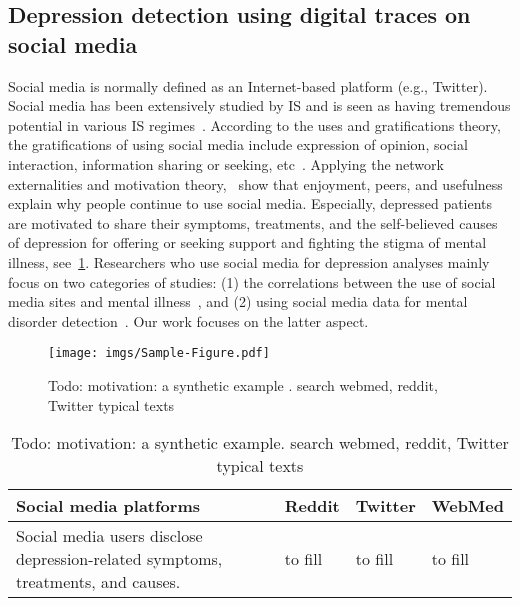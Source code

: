 \subsection{Depression detection using digital traces on social media}\label{sec:related:two}

Social media is normally defined as an Internet-based platform (e.g., Twitter). Social media has been extensively studied by IS and is seen as having tremendous potential in various IS regimes~. According to the uses and gratifications theory, the gratifications of using social media include expression of opinion, social interaction, information sharing or seeking, etc~\citep{whiting_why_2013}. Applying the network externalities and motivation theory,~ show that enjoyment, peers, and usefulness explain why people continue to use social media. Especially, depressed patients are motivated to share their symptoms, treatments, and the self-believed causes of depression for offering or seeking support and fighting the stigma of mental illness, see~\ref{fig:Coopersmith}. Researchers who use social media for depression analyses mainly focus on two categories of studies: (1) the correlations between the use of social media sites and mental illness~, and (2) using social media data for mental disorder detection~\citep{guntuku_detecting_2017}. Our work focuses on the latter aspect. 

\begin{figure}[h]
    \centering
    \noindent\texttt{[image: imgs/Sample-Figure.pdf]} 
    \caption{Todo: motivation: a synthetic example . search webmed, reddit, Twitter typical texts~\citep{coppersmith_adhd_2015,coppersmith_clpsych_2015}}
    \label{fig:Coopersmith}
\end{figure}

\begin{table}[h]
\centering
\caption{ Todo: motivation: a synthetic example. search webmed, reddit, Twitter typical texts }
\label{tb:Coopersmith}
\small
\begin{threeparttable}
    \begin{tabular}{L{80pt}C{100pt}C{100pt}C{100pt}}
    \toprule
    Social media platforms    & Reddit & Twitter & WebMed \\ \midrule
    Social media users disclose depression-related symptoms, treatments, and causes.   & to fill  & to fill &  to fill \\
    \bottomrule
    \end{tabular}
\end{threeparttable}
\end{table}


